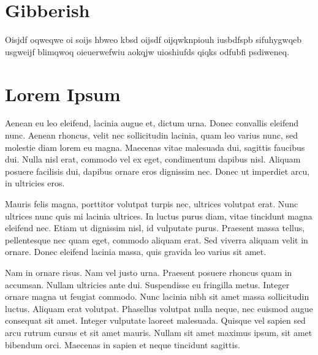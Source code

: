 \documentclass[a4paper]{article}
\begin{document}
\tableofcontents
\newpage
\section{Gibberish}
Oisjdf oqweqwe oi soijs hbweo kbsd oijsdf
oijqwknpiouh iusbdfspb sifuhygwqeb usgweijf
blimqwoq oieuerwefwiu aokqjw uioshiufds
qiqks odfubfi psdiweneq.

\section{Lorem Ipsum}
Aenean eu leo eleifend, lacinia augue et, dictum urna. Donec convallis eleifend nunc. Aenean rhoncus, velit nec sollicitudin lacinia, quam leo varius nunc, sed molestie diam lorem eu magna. Maecenas vitae malesuada dui, sagittis faucibus dui. Nulla nisl erat, commodo vel ex eget, condimentum dapibus nisl. Aliquam posuere facilisis dui, dapibus ornare eros dignissim nec. Donec ut imperdiet arcu, in ultricies eros.

Mauris felis magna, porttitor volutpat turpis nec, ultrices volutpat erat. Nunc ultrices nunc quis mi lacinia ultrices. In luctus purus diam, vitae tincidunt magna eleifend nec. Etiam ut dignissim nisl, id vulputate purus. Praesent massa tellus, pellentesque nec quam eget, commodo aliquam erat. Sed viverra aliquam velit in ornare. Donec eleifend lacinia massa, quis gravida leo varius sit amet.

Nam in ornare risus. Nam vel justo urna. Praesent posuere rhoncus quam in accumsan. Nullam ultricies ante dui. Suspendisse eu fringilla metus. Integer ornare magna ut feugiat commodo. Nunc lacinia nibh sit amet massa sollicitudin luctus. Aliquam erat volutpat. Phasellus volutpat nulla neque, nec euismod augue consequat sit amet. Integer vulputate laoreet malesuada. Quisque vel sapien sed arcu rutrum cursus et sit amet mauris. Nullam sit amet maximus ipsum, sit amet bibendum orci. Maecenas in sapien et neque tincidunt sagittis.
\end{document}
